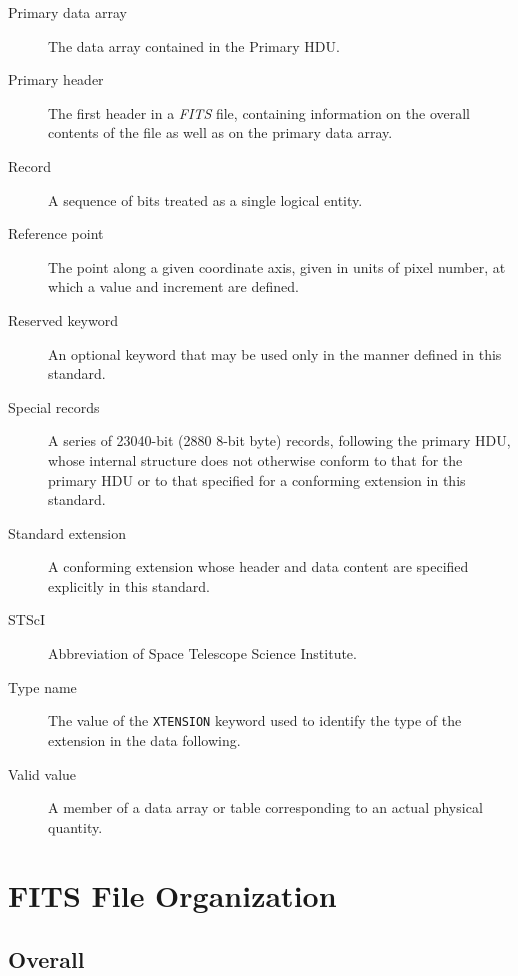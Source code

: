 \begin{description}
\item[Primary data array] The
   data array contained in the Primary HDU.
\item[Primary header] The first header 
   in a {\em FITS\/} file, containing information on the 
   overall contents of the file as well as on the
   primary data array.
\item[Record] A sequence of bits treated as a single logical entity.
\item[Reference point] The point along a given
    coordinate axis, given in 
    units
    of pixel number, at which a value and increment are defined. 
\item[Reserved keyword] An optional keyword 
   that may be used only in the manner defined in this standard.
\item[Special records] A series of 23040-bit (2880 8-bit byte) records, 
   following the primary HDU,
   whose internal structure does not otherwise conform to that for
   the primary HDU or to that specified for a conforming 
   extension in
   this standard. 
\item[Standard extension] A
     conforming 
     extension 
   whose header and data 
   content are specified explicitly in this standard.
\item[STScI] Abbreviation of Space Telescope Science Institute.
\item[Type name] The value of the {\tt XTENSION}
   keyword used to identify
   the type of the extension 
   in the data following.
\item[Valid value] A member of a data array or table corresponding to an
   actual physical quantity.
\end{description}
  
\chapter{FITS File Organization}
  \label{s:org}

  \section{Overall}
   \label{s:overorg}

